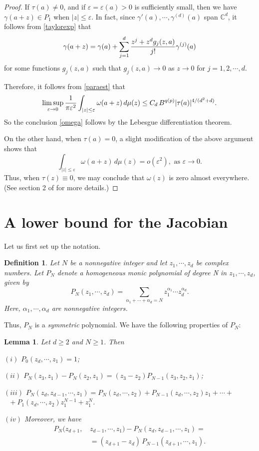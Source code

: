 \documentclass[11 pt]{amsart}
\theoremstyle{plain}
\newtheorem{lem}[theorem]{Lemma}
\newtheorem{defn}[theorem]{Definition}
\numberwithin{equation}{section}
\theoremstyle{plain}
\numberwithin{equation}{section}
\theoremstyle{remark}
\begin{document}
\begin{proof}
If $\tau(a) \not= 0$, and if ${\varepsilon} = {\varepsilon}(a) >0$ is sufficiently small, then we have $\gamma(a+z) \in P_1$ when $|z| \le {\varepsilon}$. In fact, since $\gamma'(a), \cdots, \gamma^{(d)}(a)$ span ${{\mathbb {C}}}^d$, it follows from \eqref{taylorexp} that
\begin{equation} \label{taylorexp-1}
\gamma(a+z) = \gamma(a) + \sum_{j=1}^d {z^j + z^{d} g_j (z,a)\over j!} \gamma^{(j)}(a)
\end{equation}
for some functions $g_j(z,a)$ such that $g_j(z,a) \rightarrow 0$ as $z\rightarrow 0$ for $j=1, 2, \cdots, d$.

Therefore, it follows from \eqref{paraest} that
\[ \limsup_{{\varepsilon} \to 0} {1\over \pi {\varepsilon}^{2}} \int_{|z| \le {\varepsilon}} \omega(a+z) \, d\mu (z) \le C_d \, B^{q(p)} |\tau(a)|^{4/(d^2+d)} .
\]
So the conclusion \eqref{omega} follows by the Lebesgue differentiation theorem.

On the other hand, when $\tau(a) = 0$, a slight modification of the above argument shows that
\[ \int_{|z| \le {\varepsilon}} \omega(a+z) \, d\mu (z) = o({\varepsilon}^2), \text{ as } {\varepsilon} \rightarrow 0 .
\]
Thus, when $\tau(z) \equiv 0$, we may conclude that $\omega(z)$ is zero almost everywhere. (See section 2 of \cite{BOS3} for more details.)
\end{proof}

\section{A lower bound for the Jacobian}

Let us first set up the notation.
\begin{defn}\label{PN}
Let $N$ be a nonnegative integer and let $z_1, \cdots , z_d$ be complex numbers. Let $P_N$ denote a homogeneous monic polynomial of degree N in $z_1, \cdots , z_d$, given by
\[  P_N(z_1, \cdots, z_d) =
\sum_{\alpha_1 + \cdots +\alpha_{d} = N} z_1^{\alpha_1} \cdots z_d^{\alpha_d} .\]
Here, $\alpha_1, \cdots, \alpha_{d}$ are nonnegative integers.
\end{defn}

Thus, $P_N$ is a {\it symmetric} polynomial. We have the following properties of $P_N$:
\begin{lem}\label{rmk}
Let $d\ge 2$ and $N\ge 1$. Then

\noindent
$(i)$ $P_0 (z_d, \cdots, z_1) = 1$;

\noindent
$(ii)$ $P_N(z_3, z_1) - P_N(z_2, z_1) = (z_3 - z_2)P_{N-1}(z_3, z_2, z_1)$;

\noindent
$(iii)$ $P_N(z_d, z_{d-1}, \cdots, z_1) = P_N(z_d, \cdots, z_2) + P_{N-1}(z_d, \cdots , z_2) z_1 + \cdots +$
\\
$\text{ }  + P_1(z_d, \cdots, z_2) z_1^{N-1} + z_1^N$.

\noindent
$(iv)$ Moreover, we have
\begin{align*}
P_N(z_{d+1}, \, & z_{d-1}, \cdots, z_1) - P_N (z_d, z_{d-1}, \cdots, z_1) = \\
&= (z_{d+1} - z_d) \, P_{N-1}(z_{d+1}, \cdots,  z_1) .
\end{align*}
\end{lem}
\end{document}
